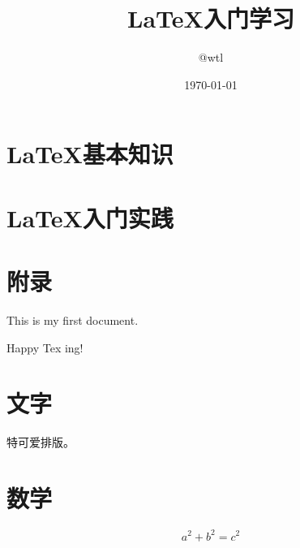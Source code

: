 \documentclass[UTF8]{ctexart}		%
\begin{document}

\title{LaTeX入门学习}				%
\author{@wtl}					%
\date{\today}					%
\maketitle 						%

\begin{abstract}%
\small{}
\end{abstract}%

\tableofcontents %
\section{LaTeX基本知识}	%
\section{LaTeX入门实践}	
\section{附录}	%

This is my first document.

Happy Tex ing!

\section{文字}
特可爱排版。
\section{数学}
\[
a^2+b^2 = c^2
\]
\end{document}
